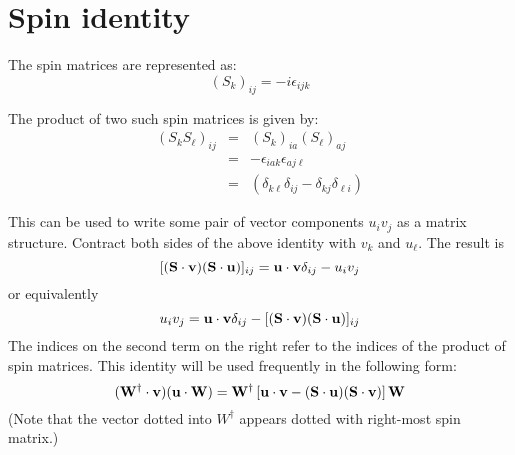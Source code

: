 \section{Spin identity}

The spin matrices are represented as:
$${(S_k)}_{ij}=-i \epsilon_{ijk}$$



The product of two such spin matrices is given by:
\begin{eqnarray*}
{(S_k S_\ell)}_{ij} 
	& = & {(S_k)}_{ia} {(S_\ell)}_{aj} \\
	& = & -\epsilon_{iak} \epsilon_{aj\ell} \\
	& = & (\delta_{k\ell} \delta_{ij} - \delta_{kj} \delta_{\ell i} )
\end{eqnarray*}

This can be used to write some pair of vector components $u_i v_j$ as a matrix structure.  Contract both sides of the above identity with $v_k$ and $u_\ell$.  The result is
\[
	[(\mathbf{S} \cdot \mathbf{v} )(\mathbf{S} \cdot \mathbf{u})]_{ij}
		= \mathbf{u} \cdot \mathbf{v} \delta_{ij} - u_i v_j 
\]
or equivalently
\[
	u_i v_j = \mathbf{u} \cdot \mathbf{v} \delta_{ij}  - [(\mathbf{S} \cdot \mathbf{v} )(\mathbf{S} \cdot \mathbf{u})]_{ij}
\]
The indices on the second term on the right refer to the indices of the product of spin matrices.  This identity will be used frequently in the following form:
\[
	(\mathbf{W^\dagger} \cdot \mathbf{v} )( \mathbf{u} \cdot \mathbf{W} )
		=	\mathbf{W^\dagger} \left[ \mathbf{u} \cdot \mathbf{v} - (\mathbf{S} \cdot \mathbf{u} )(\mathbf{S} \cdot \mathbf{v}) \right ] \mathbf{W}
\]
(Note that the vector dotted into $W^\dagger$ appears dotted with right-most spin matrix.)


